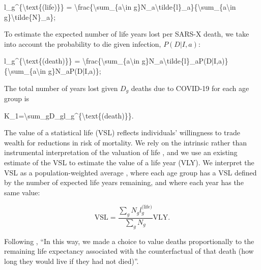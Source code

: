 \documentclass[
]{article}
\newenvironment{Shaded}{\begin{snugshade}}{\end{snugshade}}
\newcommand{\NormalTok}[1]{#1}
\begin{document}
\begin{Shaded}
\begin{Highlighting}[]
\NormalTok{l\_g\^{}\{\textbackslash{}text\{(life)\}\} = \textbackslash{}frac\{\textbackslash{}sum\_\{a\textbackslash{}in g\}N\_a\textbackslash{}tilde\{l\}\_a\}\{\textbackslash{}sum\_\{a\textbackslash{}in g\}\textbackslash{}tilde\{N\}\_a\}; }
\end{Highlighting}
\end{Shaded}

To estimate the expected number of life years lost per SARS-X death, we take into account the probability to die given infection, \(P(D|I,a)\):

\begin{Shaded}
\begin{Highlighting}[]
\NormalTok{l\_g\^{}\{\textbackslash{}text\{(death)\}\} = \textbackslash{}frac\{\textbackslash{}sum\_\{a\textbackslash{}in g\}N\_a\textbackslash{}tilde\{l\}\_aP(D|I,a)\}\{\textbackslash{}sum\_\{a\textbackslash{}in g\}N\_aP(D|I,a)\}; }
\end{Highlighting}
\end{Shaded}

The total number of years lost given \(D_g\) deaths due to COVID-19 for each age group is

\begin{Shaded}
\begin{Highlighting}[]
\NormalTok{K\_1=\textbackslash{}sum\_gD\_gl\_g\^{}\{\textbackslash{}text\{(death)\}\}.}
\end{Highlighting}
\end{Shaded}

The value of a statistical life (VSL) reflects individuals' willingness to trade wealth for reductions in risk of mortality. We rely on the intrinsic rather than instrumental interpretation of the valuation of life \citep{Cutler2020}, and we use an existing estimate of the VSL to estimate the value of a life year (VLY). We interpret the VSL as a population-weighted average \citep{Ananthapavan2021, Robinson2021}, where each age group has a VSL defined by the number of expected life years remaining, and where each year has the same value:

\begin{equation}
\text{VSL}=\frac{\sum_gN_gl_g^{\text{(life)}}}{\sum_gN_g}\text{VLY}.
\end{equation}

Following \citet{TheGlobalFund2022}, ``In this way, we made a choice to value deaths proportionally to the remaining life expectancy associated with the counterfactual of that death (how long they would live if they had not died)''.
\end{document}
